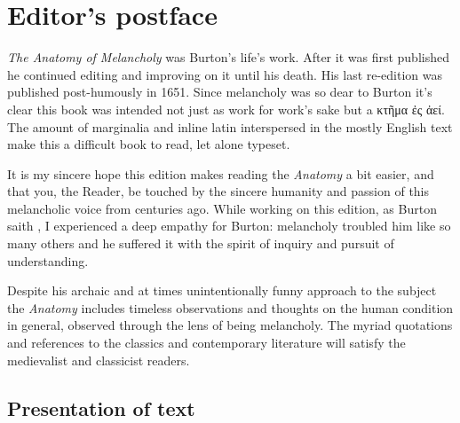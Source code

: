 \chapter{Editor's postface}\label{ch:postface}

\emph{The Anatomy of Melancholy} was Burton's life's work. After it was first published he continued editing and improving on it until his death. His last re-edition was published post-humously in 1651. Since melancholy was so dear to Burton it's clear this book was intended not just as work for work's sake but a \textgreek{κτῆμα ἐς ἀεί}. The amount of marginalia and inline latin interspersed in the mostly English text make this a difficult book to read, let alone typeset.

It is my sincere hope this edition makes reading the \emph{Anatomy} a bit easier, and that you, the Reader, be touched by the sincere humanity and passion of this melancholic voice from centuries ago. While working on this edition, as Burton saith , I experienced a deep empathy for Burton: melancholy troubled him like so many others and he suffered it with the spirit of inquiry and pursuit of understanding.

Despite his archaic and at times unintentionally funny approach to the subject the \emph{Anatomy} includes timeless observations and thoughts on the human condition in general, observed through the lens of being melancholy. The myriad quotations and references to the classics and contemporary literature will satisfy the medievalist and classicist readers.

\section*{Presentation of text}

